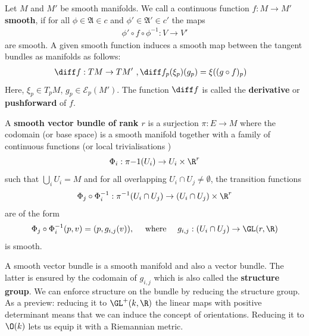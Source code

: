 \begin{definition}
	Let $M$ and $M'$ be smooth manifolds. We call a continuous function $f:M \to M'$ \textbf{smooth}, if for all $\phi\in \mathfrak{A}\in c$ and $\phi'\in \mathfrak{A}'\in c'$ the maps
	\begin{align*}
		\phi'\circ f\circ  \phi^{-1}:V\to V'
	\end{align*} are smooth. A given smooth function induces a smooth map between the tangent bundles as manifolds as follows:
	\begin{align*}
		\diff f: TM &\to TM' ~,\diff f_p(\xi_p)(g_p)=\xi((g\circ f)_p)
	\end{align*}Here, $\xi_p\in T_pM$, $g_p\in \mathcal{E}_p(M')$. The function $\diff f$ is called the \textbf{derivative} or \textbf{pushforward} of $f$.
\end{definition}
\begin{definition}
	A \textbf{smooth vector bundle of rank $r$ } is a surjection $\pi: E \to M$ where the codomain (or base space) is a smooth manifold together with a family of continuous functions (or local trivialisations )
\begin{equation*}
	\Phi_i: \pi{-1}(U_i)\to U_i\times \R^r
\end{equation*} such that  $\bigcup_i U_i=M$ and for all overlapping $U_i\cap U_j\neq \emptyset$, the transition functions
\begin{equation*}
	\Phi_j\circ \Phi_i^{-1}: \pi^{-1}(U_i\cap U_j) \to (U_i\cap U_j)\times \R^r
\end{equation*} are of the form 
\begin{equation*}
	\Phi_j\circ \Phi_i^{-1}(p,v)=(p,g_{i,j}(v)),\quad \text{ where }\quad g_{i,j}: (U_i\cap U_j) \to \GL(r,\R)
\end{equation*} is smooth.
\end{definition}
\begin{corollary}
A smooth vector bundle is a smooth manifold and also a vector bundle. The latter is ensured by the codomain of $g_{i,j}$ which is also called the \textbf{structure group}. We can enforce structure on the bundle by reducing the structure group. As a preview: reducing it to $\GL^+(k,\R)$ the linear maps with positive determinant means that we can induce the concept of orientations. Reducing it to $\O(k)$ lets us equip it with a Riemannian metric. 
\end{corollary}

